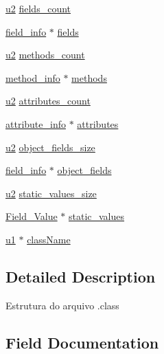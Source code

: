 \begin{DoxyCompactItemize}
\hyperlink{macros_8h_a732cde1300aafb73b0ea6c2558a7a54f}{u2} \hyperlink{struct_class_file_a8bebe0bfa4e37dde1e67c6a72af398c0}{fields\+\_\+count}
\item 
\hyperlink{structfield__info}{field\+\_\+info} $\ast$ \hyperlink{struct_class_file_ae01d16d1ab715a4f5dd1fe8254322594}{fields}
\item 
\hyperlink{macros_8h_a732cde1300aafb73b0ea6c2558a7a54f}{u2} \hyperlink{struct_class_file_a8858a4e08f7cc000e0f62459722ecce8}{methods\+\_\+count}
\item 
\hyperlink{structmethod__info}{method\+\_\+info} $\ast$ \hyperlink{struct_class_file_af0fc99630af87d96f99637f77f6bb565}{methods}
\item 
\hyperlink{macros_8h_a732cde1300aafb73b0ea6c2558a7a54f}{u2} \hyperlink{struct_class_file_aa53122439ee827a418258d52c51368c6}{attributes\+\_\+count}
\item 
\hyperlink{macros_8h_a6e3cdeb6f8c542bea1decdee365bffbb}{attribute\+\_\+info} $\ast$ \hyperlink{struct_class_file_aae221e548ab4ef529cd1a0f2fcdabb9b}{attributes}
\item 
\hyperlink{macros_8h_a732cde1300aafb73b0ea6c2558a7a54f}{u2} \hyperlink{struct_class_file_aaa9cab196b4abffb17f485b7b0f8f429}{object\+\_\+fields\+\_\+size}
\item 
\hyperlink{structfield__info}{field\+\_\+info} $\ast$ \hyperlink{struct_class_file_ab261fb2cd27e6f3eec486341c6676977}{object\+\_\+fields}
\item 
\hyperlink{macros_8h_a732cde1300aafb73b0ea6c2558a7a54f}{u2} \hyperlink{struct_class_file_a1d2ec343ad30ff71132786e288525865}{static\+\_\+values\+\_\+size}
\item 
\hyperlink{struct_field___value}{Field\+\_\+\+Value} $\ast$ \hyperlink{struct_class_file_a4ae407f89d4076465877f9db6466e98e}{static\+\_\+values}
\item 
\hyperlink{macros_8h_ad9f4cdb6757615aae2fad89dab3c5470}{u1} $\ast$ \hyperlink{struct_class_file_a46c9ac5a073e0e4714fc7746d1bc6e4f}{class\+Name}
\end{DoxyCompactItemize}


\subsection{Detailed Description}
Estrutura do arquivo .class 

\subsection{Field Documentation}
\hypertarget{struct_class_file_a4cc32d48303aeaaaaea05bf77abdec59}{}
